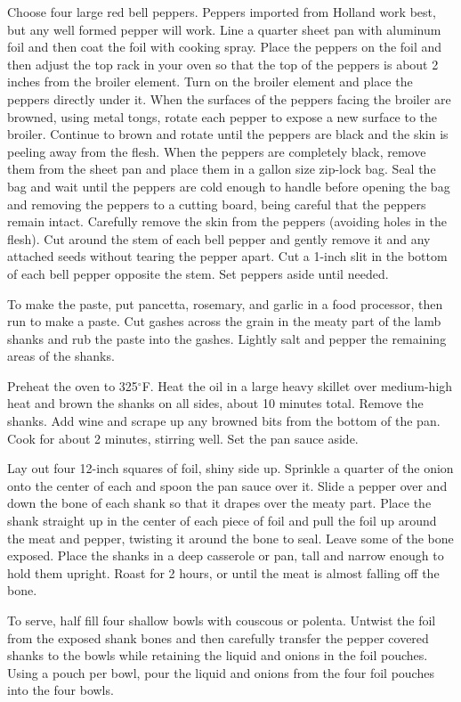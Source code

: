 \documentclass[letterpaper]{recipePMG}
\renewcommand{\deg}{$^\circ$}
\begin{document}
Choose four large red bell peppers. Peppers imported from Holland work best, but any well formed pepper will work. Line a quarter sheet pan with aluminum foil and then coat the foil with cooking spray. Place the peppers on the foil and then adjust the top rack in your oven so that the top of the peppers is about 2 inches from the broiler element. Turn on the broiler element and place the peppers directly under it. When the surfaces of the peppers facing the broiler are browned, using metal tongs, rotate each pepper to expose a new surface to the broiler. Continue to brown and rotate until the peppers are black and the skin is peeling away from the flesh. When the peppers are completely black, remove them from the sheet pan and place them in a gallon size zip-lock bag. Seal the bag and wait until the peppers are cold enough to handle before opening the bag and removing the peppers to a cutting board, being careful that the peppers remain intact. Carefully remove the skin from the peppers (avoiding holes in the flesh). Cut around the stem of each bell pepper and gently remove it and any attached seeds without tearing the pepper apart. Cut a 1-inch slit in the bottom of each bell pepper opposite the stem. Set peppers aside until needed.

To make the paste, put pancetta, rosemary, and garlic in a food processor, then run to make a paste. Cut gashes across the grain in the meaty part of the lamb shanks and rub the paste into the gashes. Lightly salt and pepper the remaining areas of the shanks.

Preheat the oven to 325\deg F. Heat the oil in a large heavy skillet over medium-high heat and brown the shanks on all sides, about 10 minutes total. Remove the shanks. Add wine and scrape up any browned bits from the bottom of the pan. Cook for about 2 minutes, stirring well. Set the pan sauce aside.

Lay out four 12-inch squares of foil, shiny side up. Sprinkle a quarter of the onion onto the center of each and spoon the pan sauce over it. Slide a pepper over and down the bone of each shank so that it drapes over the meaty part. Place the shank straight up in the center of each piece of foil and pull the foil up around the meat and pepper, twisting it around the bone to seal. Leave some of the bone exposed. Place the shanks in a deep casserole or pan, tall and narrow enough to hold them upright. Roast for 2 hours, or until the meat is almost falling off the bone. 

To serve, half fill four shallow bowls with couscous or polenta. Untwist the foil from the exposed shank bones and then carefully transfer the pepper covered shanks to the bowls while retaining the liquid and onions in the foil pouches. Using a pouch per bowl, pour the liquid and onions from the four foil pouches into the four bowls.
\end{document}

